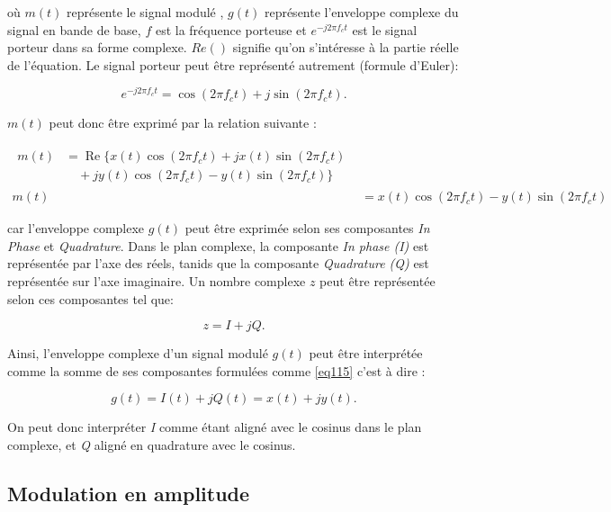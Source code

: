 où $m(t)$ représente le signal modulé , $g(t)$ représente l'enveloppe complexe du signal en bande de base, $f$ est la fréquence porteuse et $e^{-j2\pi f_c t}$ est le signal porteur dans sa forme complexe. $Re()$ signifie qu'on s'intéresse à la partie réelle de l'équation. Le signal porteur peut être représenté autrement (formule d'Euler):

\begin{equation}\label{eq111}
e^{-j2\pi f_c t} = \cos(2 \pi f_c t) + j \sin(2 \pi f_c t).
\end{equation}

$m(t)$ peut donc être exprimé par la relation suivante :

\begin{align}
    \begin{split}
    m(t) &= \operatorname{Re} \{ x(t) \cos(2 \pi f_c t) + j x(t) \sin(2 \pi f_c t) \\
         &\quad + j y(t) \cos(2 \pi f_c t) - y(t) \sin(2 \pi f_c t)\}
    \end{split} \\
    m(t) &= x(t) \cos(2 \pi f_c t) - y(t) \sin(2 \pi f_c t)
\end{align}

car l'enveloppe complexe $g(t)$ peut être exprimée selon ses composantes \textit{In Phase} et \textit{Quadrature}. Dans le plan complexe, la composante \textit{In phase (I)} est représentée par l'axe des réels, tanids que la composante \textit{Quadrature (Q)} est représentée sur l'axe imaginaire. Un nombre complexe $z$ peut être représentée selon ces composantes tel que:

\begin{equation}\label{eq115}
z = I + jQ.
\end{equation}

Ainsi, l'enveloppe complexe d'un signal modulé $g(t)$ peut être interprétée comme la somme de ses composantes formulées comme \ref{eq115} c'est à dire :

\begin{equation}\label{eq116}
g(t) = I(t) + jQ(t) = x(t) + jy(t).
\end{equation}

On peut donc interpréter \textit{I} comme étant aligné avec le cosinus dans le plan complexe, et \textit{Q} aligné en quadrature avec le cosinus.

\subsection{Modulation en amplitude}

